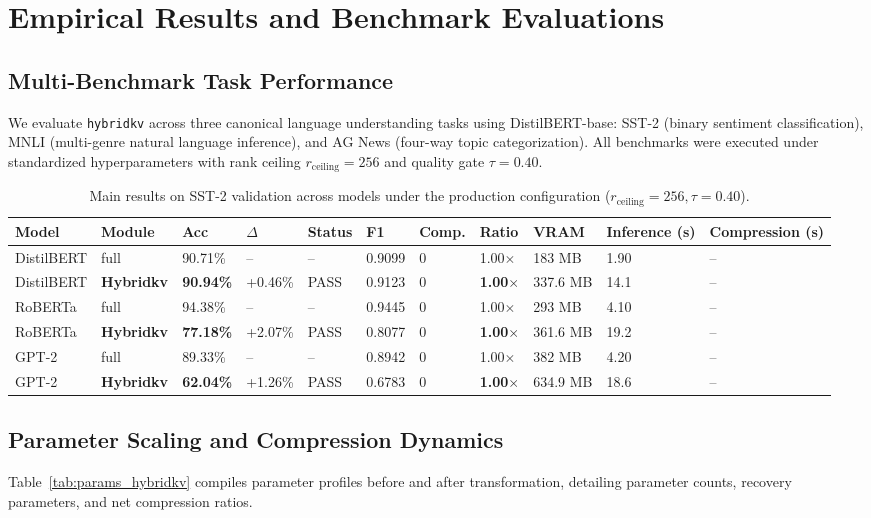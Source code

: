 \section{Empirical Results and Benchmark Evaluations}
\label{sec:results}

\subsection{Multi-Benchmark Task Performance}
We evaluate \texttt{hybridkv} across three canonical language understanding tasks using DistilBERT-base: SST-2 (binary sentiment classification), MNLI (multi-genre natural language inference), and AG News (four-way topic categorization). All benchmarks were executed under standardized hyperparameters with rank ceiling $r_{\mathrm{ceiling}} = 256$ and quality gate $\tau = 0.40$.

\begin{table}[t]
\centering
\small
\begin{tabular}{lllllllllll}
\toprule
\textbf{Model} & \textbf{Module} & \textbf{Acc} & \textbf{$\Delta$} & \textbf{Status} & \textbf{F1} & \textbf{Comp.} & \textbf{Ratio} & \textbf{VRAM} & \textbf{Inference (s)} & \textbf{Compression (s)} \\
\midrule
DistilBERT & full & 90.71\% & -- & -- & 0.9099 & 0 & 1.00$\times$ & 183 MB & 1.90 & -- \\
DistilBERT & \textbf{Hybridkv} & \textbf{90.94\%} & +0.46\% & PASS & 0.9123 & 0 & \textbf{1.00$\times$} & 337.6 MB & 14.1 & -- \\
RoBERTa & full & 94.38\% & -- & -- & 0.9445 & 0 & 1.00$\times$ & 293 MB & 4.10 & -- \\
RoBERTa & \textbf{Hybridkv} & \textbf{77.18\%} & +2.07\% & PASS & 0.8077 & 0 & \textbf{1.00$\times$} & 361.6 MB & 19.2 & -- \\
GPT-2 & full & 89.33\% & -- & -- & 0.8942 & 0 & 1.00$\times$ & 382 MB & 4.20 & -- \\
GPT-2 & \textbf{Hybridkv} & \textbf{62.04\%} & +1.26\% & PASS & 0.6783 & 0 & \textbf{1.00$\times$} & 634.9 MB & 18.6 & -- \\
\bottomrule
\end{tabular}
\caption{Main results on SST-2 validation across models under the production configuration ($r_{\mathrm{ceiling}}=256, \tau=0.40$).}
\label{tab:main_sst2}
\end{table}

\subsection{Parameter Scaling and Compression Dynamics}
Table~\ref{tab:params_hybridkv} compiles parameter profiles before and after transformation, detailing parameter counts, recovery parameters, and net compression ratios.

